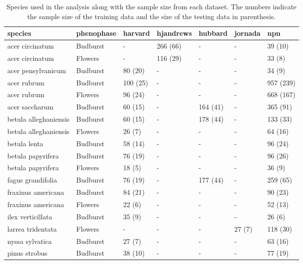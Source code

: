 \begin{table}
    \caption[Species used in the analysis along with the sample size from each dataset]{Species used in the analysis along with the sample size from each dataset. The numbers indicate the sample size of the training data and the size of the testing data in parenthesis.}
    \label{table-a-1}
\begin{tabularx}{\textwidth}{p{2.4cm}XXXXXX}
\hline
species & phenophase & harvard & hjandrews & hubbard & jornada & npn\\
\hline
acer circinatum & Budburst & - & 266 (66) & - & - & 39 (10)\\
acer circinatum & Flowers & - & 116 (29) & - & - & 33 (8)\\
acer pensylvanicum & Budburst & 80 (20) & - & - & - & 34 (9)\\
acer rubrum & Budburst & 100 (25) & - & - & - & 957 (239)\\
acer rubrum & Flowers & 96 (24) & - & - & - & 668 (167)\\
acer saccharum & Budburst & 60 (15) & - & 164 (41) & - & 365 (91)\\
betula alleghaniensis & Budburst & 60 (15) & - & 178 (44) & - & 133 (33)\\
betula alleghaniensis & Flowers & 26 (7) & - & - & - & 64 (16)\\
betula lenta & Budburst & 58 (14) & - & - & - & 96 (24)\\
betula papyrifera  & Budburst & 76 (19) & - & - & - & 96 (26)\\
betula papyrifera & Flowers & 18 (5) & - & - & - & 36 (9)\\
fagus grandifolia & Budburst & 76 (19) & - & 177 (44) & - & 259 (65)\\
fraxinus americana & Budburst & 84 (21) & - & - & - & 90 (23)\\
fraxinus americana & Flowers & 22 (6) & - & - & - & 52 (13)\\
ilex verticillata & Budburst & 35 (9) & - & - & - & 26 (6)\\
larrea tridentata & Flowers & - & - & - & 27 (7) & 118 (30)\\
nyssa sylvatica & Budburst & 27 (7) & - & - & - & 63 (16)\\
pinus strobus & Budburst & 38 (10) & - & - & - & 77 (19)\\
\hline
\end{tabularx}
\end{table}


